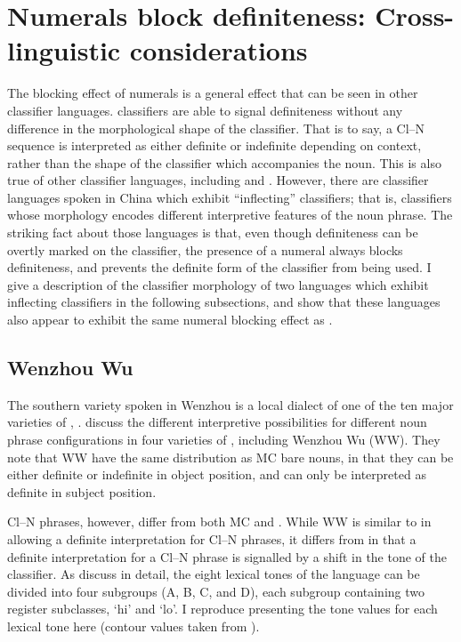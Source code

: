 \documentclass[output=paper
,modfonts
,nonflat]{langsci/langscibook}
\begin{document}
\section{Numerals block definiteness: Cross-linguistic considerations}

The blocking effect of numerals is a general effect that can be seen in other classifier languages.  classifiers are able to signal definiteness without any difference in the morphological shape of the classifier. That is to say, a Cl--N sequence is interpreted as either definite or indefinite depending on context, rather than the shape of the classifier which accompanies the noun. This is also true of other classifier languages, including  and . However, there are classifier languages spoken in China which exhibit ``inflecting'' classifiers; that is, classifiers whose morphology encodes different interpretive features of the noun phrase. The striking fact about those languages is that, even though definiteness can be overtly marked on the classifier, the presence of a numeral always blocks definiteness, and prevents the definite form of the classifier from being used. I give a description of the classifier morphology of two languages which exhibit inflecting classifiers in the following subsections, and show that these languages also appear to exhibit the same numeral blocking effect as .

\subsection{Wenzhou Wu} \label{sec:hall:4.1}

The southern  variety spoken in Wenzhou is a local dialect of one of the ten major varieties of , . \citet{ChengSybesma2005} discuss the different interpretive possibilities for different noun phrase configurations in four varieties of , including Wenzhou Wu (WW). They note that WW  have the same distribution as MC bare nouns, in that they can be either definite or indefinite in object position, and can only be interpreted as definite in subject position.

Cl--N phrases, however, differ from both MC and . While WW is similar to  in allowing a definite interpretation for Cl--N phrases, it differs from  in that a definite interpretation for a Cl--N phrase is signalled by a shift in the tone of the classifier. As \citet{ChengSybesma2005} discuss in detail, the eight lexical tones of the language can be divided into four subgroups (A, B, C, and D), each subgroup containing two register subclasses, `hi' and `lo'. I reproduce  presenting the tone values for each lexical tone here (contour values taken from \citealt{Norman1988}).
\end{document}
